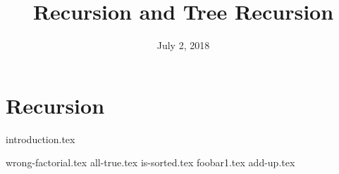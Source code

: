 \documentclass{exam}
\title{Recursion and Tree Recursion}
\date{July 2, 2018}
\begin{document}
\maketitle

\section{Recursion}
{introduction.tex}
\begin{questions}
{wrong-factorial.tex}
{all-true.tex}
\clearpage
{is-sorted.tex}
\newpage
{foobar1.tex}
\clearpage
{add-up.tex}
\end{questions}
\end{document}
